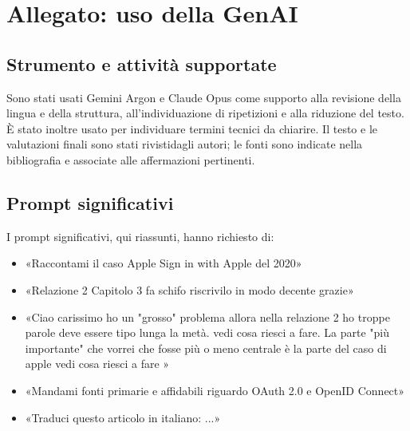 \section*{Allegato: uso della GenAI}

\subsection*{Strumento e attività supportate}
Sono stati usati Gemini Argon e Claude Opus come supporto alla revisione della lingua e della
struttura, all'individuazione di ripetizioni e alla riduzione del testo. È
stato inoltre usato per individuare termini tecnici da chiarire.
Il testo e le valutazioni finali sono stati rivistidagli autori;
le fonti sono indicate nella bibliografia e associate alle affermazioni pertinenti.

\subsection*{Prompt significativi}
I prompt significativi, qui riassunti, hanno richiesto di:
\begin{itemize}
    \item «Raccontami il caso Apple Sign in with Apple del 2020»
    \item «Relazione 2 Capitolo 3 fa schifo riscrivilo in modo decente grazie»
    \item «Ciao carissimo ho un "grosso" problema allora nella relazione 2 ho troppe parole deve essere tipo lunga la metà. vedi cosa riesci a fare. La parte "più importante" che vorrei che fosse più o meno centrale è la parte del caso di apple vedi cosa riesci a fare »
    \item «Mandami fonti primarie e affidabili riguardo OAuth 2.0 e OpenID Connect»
    \item «Traduci questo articolo in italiano: ...»
\end{itemize}
